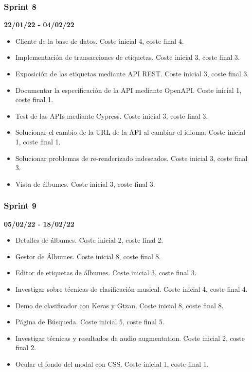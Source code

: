 \subsubsection{Sprint 8}
\textbf{22/01/22 - 04/02/22}
\begin{itemize}
    \item Cliente de la base de datos. Coste inicial 4, coste final 4.
    \item Implementación de transacciones de etiquetas. Coste inicial 3, coste final 3.
    \item Exposición de las etiquetas mediante API REST. Coste inicial 3, coste final 3.
    \item Documentar la especificación de la API mediante OpenAPI. Coste inicial 1, coste final 1.
    \item Test de las APIs mediante Cypress. Coste inicial 3, coste final 3. 
    \item Solucionar el cambio de la URL de la API al cambiar el idioma. Coste inicial 1, coste final 1.
    \item Solucionar problemas de re-renderizado indeseados. Coste inicial 3, coste final 3.
    
    \item Vista de álbumes. Coste inicial 3, coste final 3.
\end{itemize}







\subsubsection{Sprint 9}
\textbf{05/02/22 - 18/02/22}
\begin{itemize}
    \item Detalles de álbumes. Coste inicial 2, coste final 2. 
    \item Gestor de Álbumes. Coste inicial 8, coste final 8.
    \item Editor de etiquetas de álbumes. Coste inicial 3, coste final 3.
    \item Investigar sobre técnicas de clasificación musical. Coste inicial 4, coste final 4.
    \item Demo de clasificador con Keras y Gtzan. Coste inicial 8, coste final 8.
    \item Página de Búsqueda. Coste inicial 5, coste final 5.
    \item Investigar técnicas y resultados de audio augmentation. Coste inicial 2, coste final 2.
    \item Ocular el fondo del modal con CSS. Coste inicial 1, coste final 1.
\end{itemize}


